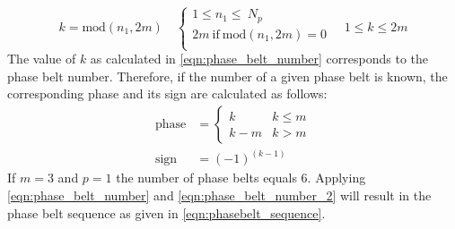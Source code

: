 \begin{equation}
  \label{eqn:phase_belt_number}
  k = \mbox{mod}(n_1,2m)
  \quad
  \begin{cases}
    1 \leq n_1 \leq \ N_p \\
    2m \ \mbox{if} \ \mbox{mod}(n_1,2m)=0 \\
  \end{cases}
  \quad
  1\leq k \leq 2m
\end{equation}  
The value of $k$ as calculated in \eqref{eqn:phase_belt_number} corresponds to the phase belt number. Therefore, if the number of a given phase belt is known, the corresponding phase and its sign are calculated as follows:
\begin{equation}
  \label{eqn:phase_belt_number_2}
  \begin{aligned}
  \mbox{phase}&= 
    \left\{
    \begin{array}{ll}
      k   & k \leq m\\
      k-m & k > m
    \end{array}
    \right.
    \\
  \mbox{sign}&=(-1)^{(k-1)} 
  \end{aligned}
\end{equation}  
If $m=3$ and $p=1$ the number of phase belts equals 6. Applying \eqref{eqn:phase_belt_number} and \eqref{eqn:phase_belt_number_2} will result in the phase belt sequence as given in \eqref{eqn:phasebelt_sequence}. 


